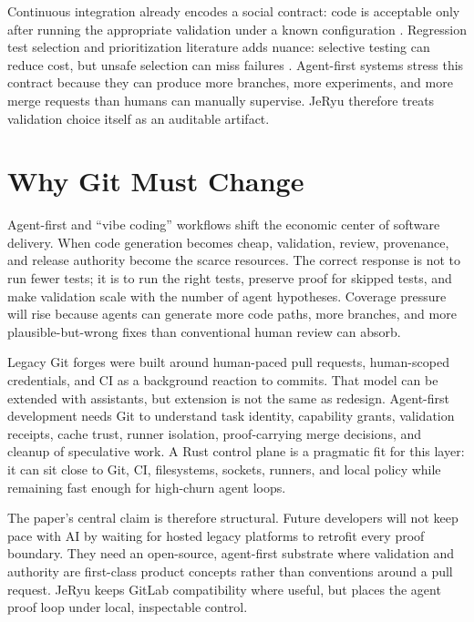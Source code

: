 \documentclass[conference]{IEEEtran}
\begin{document}
Continuous integration already encodes a social contract: code is acceptable only after running the appropriate validation under a known configuration \cite{continuous-integration}. Regression test selection and prioritization literature adds nuance: selective testing can reduce cost, but unsafe selection can miss failures \cite{regression-test-selection-survey,safe-regression-test-selection,test-prioritization}. Agent-first systems stress this contract because they can produce more branches, more experiments, and more merge requests than humans can manually supervise. JeRyu therefore treats validation choice itself as an auditable artifact.

\section{Why Git Must Change}
Agent-first and ``vibe coding'' workflows shift the economic center of software delivery. When code generation becomes cheap, validation, review, provenance, and release authority become the scarce resources. The correct response is not to run fewer tests; it is to run the right tests, preserve proof for skipped tests, and make validation scale with the number of agent hypotheses. Coverage pressure will rise because agents can generate more code paths, more branches, and more plausible-but-wrong fixes than conventional human review can absorb.

Legacy Git forges were built around human-paced pull requests, human-scoped credentials, and CI as a background reaction to commits. That model can be extended with assistants, but extension is not the same as redesign. Agent-first development needs Git to understand task identity, capability grants, validation receipts, cache trust, runner isolation, proof-carrying merge decisions, and cleanup of speculative work. A Rust control plane is a pragmatic fit for this layer: it can sit close to Git, CI, filesystems, sockets, runners, and local policy while remaining fast enough for high-churn agent loops.

The paper's central claim is therefore structural. Future developers will not keep pace with AI by waiting for hosted legacy platforms to retrofit every proof boundary. They need an open-source, agent-first substrate where validation and authority are first-class product concepts rather than conventions around a pull request. JeRyu keeps GitLab compatibility where useful, but places the agent proof loop under local, inspectable control.
\end{document}
